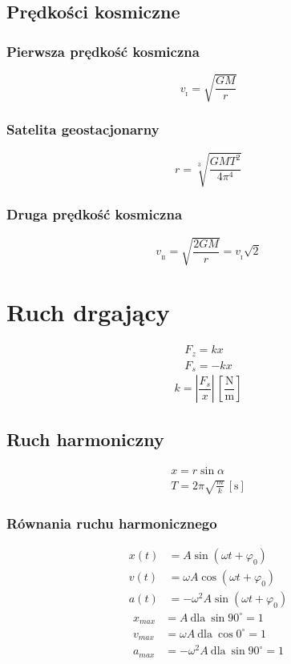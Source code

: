 \documentclass{report}
\numberwithin{equation}{chapter}
\newcommand{\unit}[1]{\,\left[\mathrm{#1}\right]}
\begin{document}
    \section{Prędkości kosmiczne}
      \subsection{Pierwsza prędkość kosmiczna}
        \begin{equation}
          v_{{}_\mathrm{I}} = \sqrt{\frac{GM}{r}}
        \end{equation}
      \subsection{Satelita geostacjonarny}
        \begin{equation}
          r = \sqrt[3]{\frac{GMT^2}{4\pi^4}}
        \end{equation}
      \subsection{Druga prędkość kosmiczna}
        \begin{equation}
          v_{{}_\mathrm{II}} = \sqrt{\frac{2GM}{r}} = v_{{}_\mathrm{I}}\sqrt{2}
        \end{equation}

  \newpage
  \chapter{Ruch drgający}
    \begin{gather}
      F_z = kx\\
      F_s = -kx
    \end{gather}
    \begin{equation}
      k = \left|\frac{F_s}{x}\right| \unit{\frac Nm}
    \end{equation}
    \section{Ruch harmoniczny}
      \begin{gather}
        x = r\sin\alpha\\
        T = 2\pi\sqrt{\frac mk} \unit{s}
      \end{gather}
      \subsection{Równania ruchu harmonicznego}
        \begin{align}
          x(t) &= A\sin(\omega t + \varphi_0)\\
          v(t) &= \omega A\cos(\omega t + \varphi_0)\\
          a(t) &= -\omega^2A\sin(\omega t + \varphi_0)
        \end{align}
        \begin{align}
          x_{max} &= A\ \text{dla}\ \sin90^\circ = 1\\
          v_{max} &= \omega A\ \text{dla}\ \cos0^\circ = 1\\
          a_{max} &= -\omega^2A\ \text{dla}\ \sin90^\circ = 1\\
        \end{align}
\end{document}
